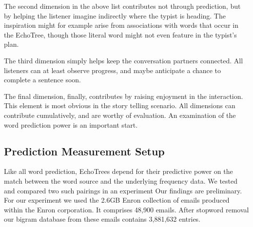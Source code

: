 \documentclass{sigchi}
\newcommand\T{\rule{0pt}{2.5ex}}%
\newcommand\B{\rule[-1ex]{0pt}{0pt}}%
\begin{document}
The second dimension in the above list contributes not through
prediction, but by helping the listener imagine indirectly where the
typist is heading. The inspiration might for example arise from
associations with words that occur in the EchoTree, though those
literal word might not even feature in the typist's plan.

The third dimension simply helps keep the conversation partners
connected. All listeners can at least observe progress, and maybe
anticipate a chance to complete a sentence soon.

The final dimension, finally, contributes by raising enjoyment in the
interaction. This element is most obvious in the story telling
scenario. All dimensions can contribute cumulatively, and are worthy
of evaluation. An examination of the word prediction power is an
important start. 

\subsection{Prediction Measurement Setup}
Like all word prediction, EchoTrees depend for their predictive power
on the match between the word source and the underlying frequency
data. We tested and compared two such pairings in an experiment
Our findings are preliminary. For our experiment we used the 2.6GB
Enron collection of emails produced within the Enron corporation. It
comprises 48,900 emails. After stopword removal our bigram database
from these emails contains 3,881,632 entries.
\end{document}
